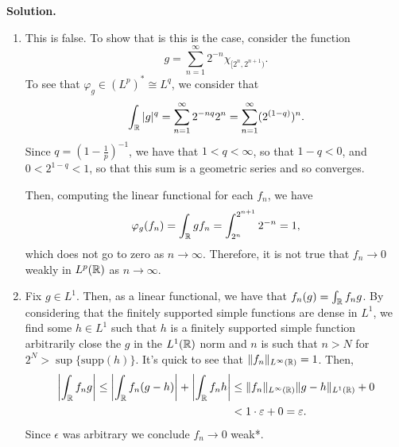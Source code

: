 \documentclass[11pt]{article}
\begin{document}
\begin{enumerate}
\textbf{Solution.}

\begin{enumerate}
    \item 
        This is false. To show that is this is the case, consider the function 
        \[
        g = \sum_{n = 1}^{\infty} 2^{-n} \chi_{[2^{n}, 2^{n+1})}
        .\] 
        To see that $\varphi_{g} \in (L^{p})^{*} \cong L^{q}$, we consider that
        \[
        \int_{\mathbb{R}} |g|^{q} = \sum_{n=1}^{\infty} 2^{-nq}2^{n} = \sum_{n = 1}^{\infty} (2^{(1 - q)})^{n}
        .\] 
        Since $q = (1 - \frac{1}{p})^{-1}$, we have that $1 < q < \infty$, so that $1 - q < 0$, and $0 < 2^{1 - q} < 1$, so that this sum is a geometric series and so converges.

        Then, computing the linear functional for each $f_n$, we have
        \[
        \varphi_{g}(f_n) = \int_{\mathbb{R}} g f_n = \int_{2^{n}}^{2^{n+1}} 2^{-n} = 1
        ,\] 
        which does not go to zero as $n \to \infty$.
        Therefore, it is not true that $f_n \to 0$ weakly in $L^{p}(\mathbb{R})$ as $n \to \infty$.



    \item Fix $g \in L^{1}$.
        Then, as a linear functional, we have that $f_n(g) = \int_{\mathbb{R}} f_n g$.
        By considering that the finitely supported simple functions are dense in $L^{1}$, we find some $h \in L^{1}$ such that $h$ is a finitely supported simple function arbitrarily close the $g$ in the $L^{1}(\mathbb{R})$ norm and $n$ is such that $n > N$ for $2^{N} > \sup \{\mathrm{supp}(h)\} $.
        It's quick to see that $\|f_n\|_{L^{\infty}(\mathbb{R})}= 1$.
        Then,
        \begin{align*}
            \left| \int_{\mathbb{R}} f_n g \right| \leq \left| \int_{\mathbb{R}} f_n (g - h) \right|  + \left| \int_{\mathbb{R}} f_n h \right| &\leq \|f_n\|_{L^{\infty}(\mathbb{R})} \|g - h\|_{L^{1}(\mathbb{R})} + 0\\
            &<  1 \cdot  \varepsilon + 0 = \varepsilon
        .\end{align*}
        Since $\epsilon$ was arbitrary we conclude $f_n \to 0$ weak*.
\end{enumerate}

\end{enumerate}
\end{document}
